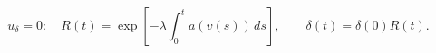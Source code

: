 \documentclass[12pt]{article}
\begin{document}
\fontsize{22}{28}\selectfont\[u_\delta=0:\quad R(t)=\exp\!\left[-\lambda\int_0^t a(v(s))\,ds\right],\qquad\delta(t)=\delta(0)R(t).\]
\end{document}
